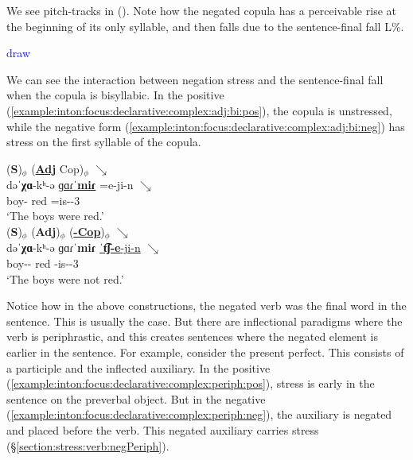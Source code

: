 We see pitch-tracks in (). Note how the negated copula has a perceivable rise at the beginning of its only syllable, and then falls due to the sentence-final fall L\%. 

\textcolor{blue}{draw}

We can see the interaction between negation stress and the sentence-final fall when the copula is bisyllabic. In the positive (\ref{example:inton:focus:declarative:complex:adj:bi:pos}), the copula is unstressed, while the negative form (\ref{example:inton:focus:declarative:complex:adj:bi:neg}) has stress on the first syllable of the copula. 


\begin{exe}
	\ex \begin{xlist}
		\ex \glll   (\textbf{S})$_\phi$ (\underline{\textbf{Adj}} Cop)$_\phi$ $\searrow$ \\
		dəˈ\textbf{χɑ}-kʰ-ə \underline{ɡɑɾˈ\textbf{miɾ}} =e-ji-n  $\searrow$ \\
		boy-{\pl}{} red =is-{\pst}-3{\pl}   \\
		\trans `The boys were red.' 
		\label{example:inton:focus:declarative:complex:adj:bi:pos}
		\\  
		\ex \glll   (\textbf{S})$_\phi$ (\textbf{Adj})$_\phi$ (\underline{\textbf{{\neggloss}-Cop}})$_\phi$ $\searrow$ \\
		dəˈ\textbf{χɑ}-kʰ-ə  {ɡɑɾˈ\textbf{miɾ}} \underline{ˈ\textbf{t͡ʃ-e}-ji-n} $\searrow$ \\
		boy-{\pl}-{} red   {\neggloss}-is-{\pst}-3{\pl} \\ 
		\trans `The boys were not red.' \label{example:inton:focus:declarative:complex:adj:bi:neg}
		\\ 
		
	\end{xlist}
\end{exe}

Notice how in the above constructions, the negated verb was the final word in the sentence. This is usually the case. But there are inflectional paradigms where the verb is periphrastic, and this creates sentences where the negated element is     earlier in the sentence. For example, consider the present perfect. This consists of a participle and the inflected auxiliary. In the positive (\ref{example:inton:focus:declarative:complex:periph:pos}), stress is early in the sentence on the preverbal object. But in the negative (\ref{example:inton:focus:declarative:complex:periph:neg}), the auxiliary is negated and placed before the verb. This negated auxiliary carries stress (\S\ref{section:stress:verb:negPeriph}). 


